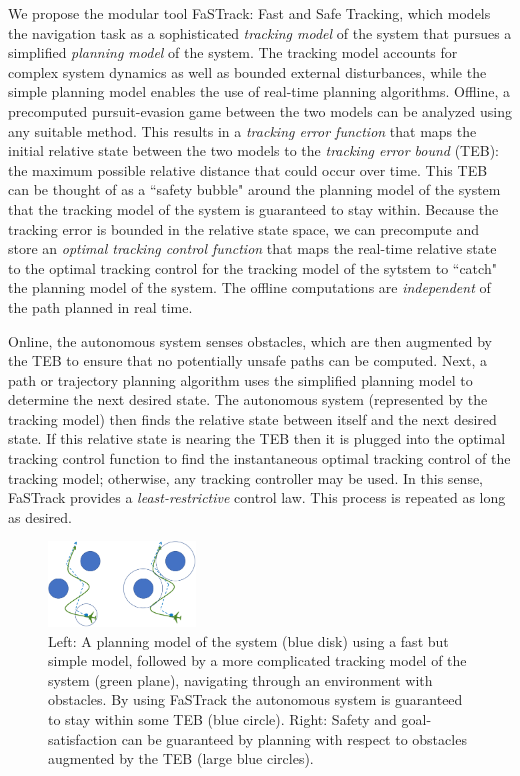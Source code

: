 We propose the modular tool FaSTrack: Fast and Safe Tracking, which models the navigation task as a sophisticated \textit{tracking model} of the system that pursues a simplified \textit{planning model} of the system. 
The tracking model accounts for complex system dynamics as well as bounded external disturbances, while the simple planning model enables the use of real-time planning algorithms. 
Offline, a precomputed pursuit-evasion game between the two models can be analyzed using any suitable method. 
This results in a \textit{tracking error function} that maps the initial relative state between the two models to the \textit{tracking error bound} (TEB): the maximum possible relative distance that could occur over time. 
This TEB can be thought of as a ``safety bubble" around the planning model of the system that the tracking model of the system is guaranteed to stay within. 
Because the tracking error is bounded in the relative state space, we can precompute and store an \textit{optimal tracking control function} that  maps the real-time relative state to the optimal tracking control for the tracking model of the sytstem to ``catch" the planning model of the system. 
The offline computations are \textit{independent} of the path planned in real time.

Online, the autonomous system senses obstacles, which are then augmented by the TEB to ensure that no potentially unsafe paths can be computed. 
Next, a path or trajectory planning algorithm uses the simplified planning model to determine the next desired state. 
The autonomous system (represented by the tracking model) then finds the relative state between itself and the next desired state. 
If this relative state is nearing the TEB then it is plugged into the optimal tracking control function to find the instantaneous optimal tracking control of the tracking model; otherwise, any tracking controller may be used. In this sense, FaSTrack provides a \emph{least-restrictive} control law. 
This process is repeated as long as desired. 
  
\begin{figure}
	\centering
	\includegraphics[width=0.35\textwidth]{fig/chasing}
	\caption{Left: A planning model of the system (blue disk) using a fast but simple model, followed by a more complicated tracking model of the system (green plane), navigating through an environment with obstacles. By using FaSTrack the autonomous system is guaranteed to stay within some TEB (blue circle). Right: Safety and goal-satisfaction can be guaranteed by planning with respect to obstacles augmented by the TEB (large blue circles).}
	\label{fig:chasing}
\end{figure}
%

